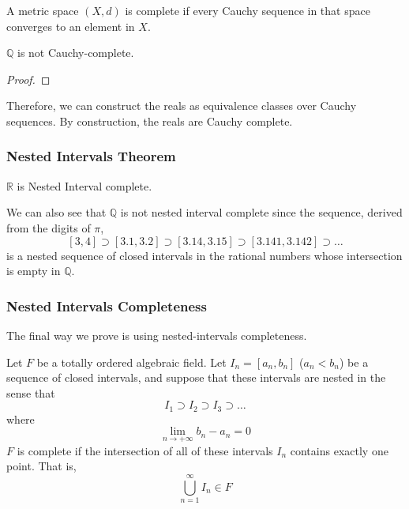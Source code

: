 \documentclass{article}
\begin{document}
      \begin{definition}
        A metric space $(X, d)$ is complete if every Cauchy sequence in that space converges to an element in $X$. 
      \end{definition} 

      \begin{theorem}
        $\mathbb{Q}$ is not Cauchy-complete. 
      \end{theorem}
      \begin{proof}
        
      \end{proof}

      Therefore, we can construct the reals as equivalence classes over Cauchy sequences. By construction, the reals are Cauchy complete. 

    \subsubsection{Nested Intervals Theorem}

      \begin{lemma}
        $\mathbb{R}$ is Nested Interval complete. 
      \end{lemma}

      We can also see that $\mathbb{Q}$ is not nested interval complete since the sequence, derived from the digits of $\pi$, 
      \[[3,4] \supset [3.1, 3.2] \supset [3.14, 3.15] \supset [3.141, 3.142] \supset \ldots\]
      is a nested sequence of closed intervals in the rational numbers whose intersection is empty in $\mathbb{Q}$. 

    \subsubsection{Nested Intervals Completeness} 

      The final way we prove is using nested-intervals completeness.  

      \begin{definition}
        Let $F$ be a totally ordered algebraic field. Let $I_n= [a_n, b_n]$ ($a_n < b_n$) be a sequence of closed intervals, and suppose that these intervals are nested in the sense that
        \[I_1 \supset I_2 \supset I_3 \supset \ldots\]
        where 
        \[\lim_{n \rightarrow + \infty} b_n - a_n = 0\]
        $F$ is complete if the intersection of all of these intervals $I_n$ contains exactly one point. That is, 
        \[\bigcup_{n=1}^\infty I_n \in F\]
      \end{definition}
\end{document}
